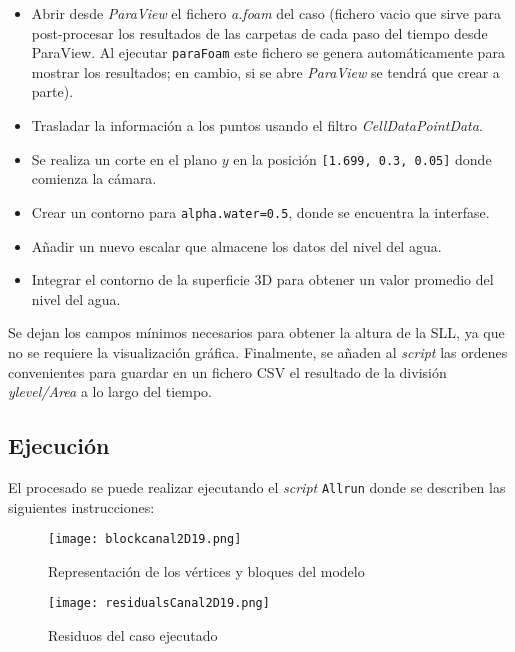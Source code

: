 \begin{itemize}
\begin{itemize}
    \begin{itemize}
    \item
      Abrir desde \emph{ParaView} el fichero \emph{a.foam} del caso
      (fichero vacio que sirve para post-procesar los resultados de las
      carpetas de cada paso del tiempo desde ParaView. Al ejecutar
      \texttt{paraFoam} este fichero se genera automáticamente para
      mostrar los resultados; en cambio, si se abre \emph{ParaView} se
      tendrá que crear a parte).
    \item
      Trasladar la información a los puntos usando el filtro
      \emph{CellDataPointData}.
    \item
      Se realiza un corte en el plano $y$ en la posición
      \lstinline[style=bash]{[1.699, 0.3, 0.05]} donde comienza la cámara.
    \item
      Crear un contorno para \lstinline[style=bash]{alpha.water=0.5}, donde se encuentra
      la interfase.
    \item
      Añadir un nuevo escalar que almacene los datos del nivel del agua.
    \item
      Integrar el contorno de la superficie 3D para obtener un valor
      promedio del nivel del agua.
    \end{itemize}

    Se dejan los campos mínimos necesarios para obtener la altura de la
    SLL, ya que no se requiere la visualización gráfica. Finalmente, se
    añaden al \emph{script} las ordenes convenientes para guardar en un
    fichero CSV el resultado de la división \emph{ylevel/Area} a lo
    largo del tiempo.
  \end{itemize}
\end{itemize}

\subsection{Ejecución}\label{header-n140}

El procesado se puede realizar ejecutando el \emph{script}
\texttt{Allrun} donde se describen las siguientes instrucciones:

\begin{figure}[hb]
\centering
\texttt{[image: blockcanal2D19.png]}
\caption{Representación de los vértices y bloques del modelo}
\label{fig:blockcanal2D19}
\end{figure}

\begin{figure}[hb]
\centering
\texttt{[image: residualsCanal2D19.png]}
\caption{Residuos del caso ejecutado}
\label{fig:residualsCanal2D19}
\end{figure}

